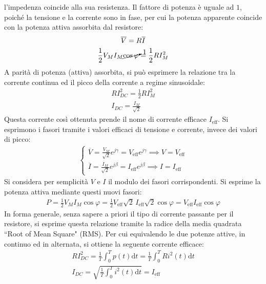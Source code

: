 \documentclass{article}
\newcommand{\df}{\mathrm{d}}
\numberwithin{equation}{subsection}
\begin{document}
l'impedenza coincide alla sua resistenza. Il fattore di potenza è uguale ad $1$, poiché la tensione e la corrente sono in fase, per cui la potenza apparente coincide con la 
potenza attiva assorbita dal resistore:
\begin{gather*}
    \overline{V}=R\overline{I}\\
    \displaystyle\frac{1}{2}V_MI_M\cancelto{1}{\cos\varphi}=\frac{1}{2}RI_M^2
\end{gather*}
A parità di potenza (attiva) assorbita, si può esprimere la relazione tra la corrente continua ed il picco della corrente a regime sinusoidale:
\begin{gather*}
    RI_{DC}^2=\displaystyle\frac{1}{2}RI_M^2\\
    I_{DC}=\displaystyle\frac{I_M}{\sqrt{2}}
\end{gather*}
Questa corrente così ottenuta prende il nome di corrente efficace $I_{\mbox{eff}}$. 
Si esprimono i fasori tramite i valori efficaci di tensione e corrente, invece dei valori di picco:
\begin{gather*}
    \begin{cases}
        \overline{V}=\displaystyle\frac{V_{M}}{\sqrt{2}}e^{j\gamma}=V_{\mbox{eff}}e^{j\gamma}\implies V=V_{\mbox{eff}}\\
        \overline{I}=\displaystyle\frac{I_{M}}{\sqrt{2}}e^{j\beta}=I_{\mbox{eff}}e^{j\beta}\implies I=I_{\mbox{eff}}
    \end{cases}
\end{gather*}
Si considera per semplicità $V$ e $I$ il modulo dei fasori corrispondenti. 
Si esprime la potenza attiva mediante questi nuovi fasori: 
\begin{gather*}
    P=\displaystyle\frac{1}{2}V_MI_M\cos\varphi=\frac{1}{2}V_{\mbox{eff}}\sqrt{2}\,I_{\mbox{eff}}\sqrt{2}\cos\varphi=V_{\mbox{eff}}I_{\mbox{eff}}\cos\varphi
\end{gather*}
In forma generale, senza sapere a priori il tipo di corrente passante per il resistore, si esprime questa relazione tramite la radice 
della media quadrata ``Root of Mean Square" (RMS). Per cui equivalendo le due potenze attive, in continuo ed in alternata, si ottiene la seguente corrente efficace: 
\begin{gather*}
    RI_{DC}^2=\displaystyle\frac{1}{T}\int_0^Tp(t)\df t=\frac{1}{T}\int_0^TRi^2(t)\df t\\
    I_{DC}=\displaystyle\sqrt{\frac{1}{T}\int_0^Ti^2(t)\df t}=I_{\mbox{eff}}
\end{gather*}
\end{document}
